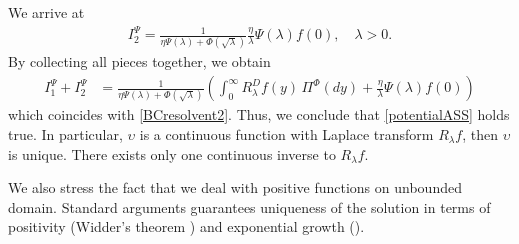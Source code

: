 \documentclass[11pt,a4paper]{article}
\theoremstyle{plain}
\theoremstyle{definition}
\theoremstyle{remark}
\begin{document}
		We arrive at
		\begin{align*}
			I_2^\Psi =  \frac{1}{\eta \Psi(\lambda)+ \Phi(\sqrt \lambda)} \frac{\eta}{\lambda} \Psi(\lambda) f(0), \quad \lambda>0.
		\end{align*}
		By collecting all pieces together, we obtain
		\begin{align}
			I_1^\Psi+I_2^\Psi
			&=\frac{1}{\eta \Psi(\lambda) +\Phi(\sqrt \lambda)} \left( \int_0^\infty R_\lambda^D f(y) \, \Pi^\Phi(dy) + \frac{\eta}{\lambda} \Psi(\lambda)f(0) \right)
			\label{I1piuI2}
		\end{align}
		which coincides with \eqref{BCresolvent2}. Thus, we conclude that \eqref{potentialASS} holds true. In particular, $\upsilon$ is a continuous function with Laplace transform $R_\lambda f$, then $\upsilon$ is unique. There exists only one continuous inverse to $R_\lambda f$.
		
		We also stress the fact that we deal with positive functions on unbounded domain. Standard arguments guarantees uniqueness of the solution in terms of positivity (Widder's theorem \cite{widder1944positive}) and exponential growth (\cite[section 2.3.3]{evans2010partial}).
\end{document}
